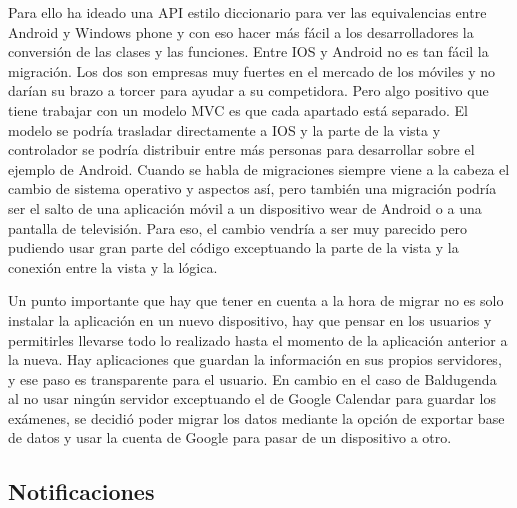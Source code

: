 Para ello ha ideado una API estilo diccionario para ver las equivalencias entre Android y Windows phone y con eso hacer más fácil a los desarrolladores la conversión de las clases y las funciones.
Entre IOS y Android no es tan fácil la migración. Los dos son empresas muy fuertes en el mercado de los móviles y no darían su brazo a torcer para ayudar a su competidora.
Pero algo positivo que tiene trabajar con un modelo MVC es que cada apartado está separado.
El modelo se podría trasladar directamente a IOS y la parte de la vista y controlador se podría distribuir entre más personas para desarrollar sobre el ejemplo de Android.
Cuando se habla de migraciones siempre viene a la cabeza el cambio de sistema operativo y aspectos así, pero también una migración podría ser el salto de una aplicación móvil a un dispositivo wear de Android o a una pantalla de televisión. Para eso, el cambio vendría a ser muy parecido pero pudiendo usar gran parte del código exceptuando la parte de la vista y la conexión entre la vista y la lógica.

Un punto importante que hay que tener en cuenta a la hora de migrar no es solo instalar la aplicación en un nuevo dispositivo, hay que pensar en los usuarios y permitirles llevarse todo lo realizado hasta el momento de la aplicación anterior a la nueva.
Hay aplicaciones que guardan la información en sus propios servidores, y ese paso es transparente para el usuario.
En cambio en el caso de Baldugenda al no usar ningún servidor exceptuando el de Google Calendar para guardar los exámenes, se decidió poder migrar los datos mediante la opción de exportar base de datos y usar la cuenta de Google para pasar de un dispositivo a otro.

\subsection{Notificaciones}
\label{subsecc:Notificaciones}

